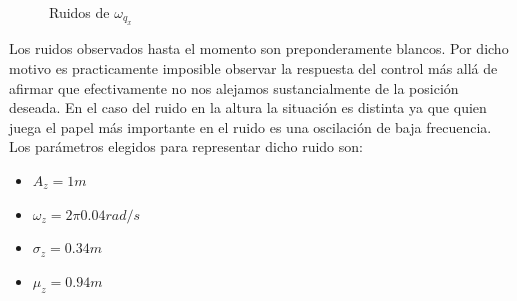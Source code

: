 \documentclass[main]{subfiles}
\begin{document}
\begin{figure}[h!]
\vspace{-20pt}
  \centering
  \caption{Ruidos de $\omega_{q_x}$}
  \label{fig:ruidos_wqx}
\vspace{-10pt}
\end{figure}


Los ruidos observados hasta el momento son preponderamente blancos. Por dicho motivo es practicamente imposible observar la respuesta del control m\'as all\'a de afirmar que efectivamente no nos alejamos sustancialmente de la posici\'on deseada. En el caso del ruido en la altura la situaci\'on es distinta ya que quien juega el papel m\'as importante en el ruido es una oscilaci\'on de baja frecuencia. Los par\'ametros elegidos para representar dicho ruido son:

\begin{itemize}
\item $A_z = 1 m$
\item $\omega_{z} = 2\pi 0.04 rad/s$
\item $\sigma_{z} = 0.34 m$
\item $\mu_{z} = 0.94 m$
\end{itemize}
\end{document}
